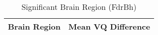 \begin{table}
\caption{Significant Brain Region (FdrBh)}
\label{tab:significant_VQ_FdrBh}
\begin{tabular}{ll}
\toprule
Brain Region & Mean VQ Difference \\
\midrule
\bottomrule
\end{tabular}
\end{table}
